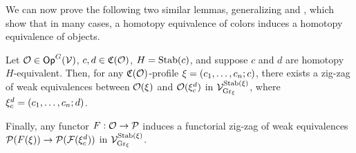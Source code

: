 \documentclass[a4paper,10pt
]{article}%
\renewcommand{\F}{\mathcal F}
\renewcommand{\1}{\ensuremath{\mathbb{id}}}
\begin{document}
We can now prove the following two similar lemmas, generalizing \cite[Prop. 4.14]{Cav14} and \cite[Prop. 2.12]{BM13},
which show that in many cases, a homotopy equivalence of colors induces a homotopy equivalence of objects.

\begin{lemma}
      \label{CAV_4.14_PROP1}
      Let $\mathcal{O} \in \mathsf{Op}^G(\mathcal V)$,
      $c,d \in \mathfrak C(\mathcal{O})$, 
      $H = \mathrm{Stab}(c)$, and suppose $c$ and $d$ are homotopy $H$-equivalent.
      Then, for any $\mathfrak C(\mathcal{O})$-profile $\xi = (c_1,\dots, c_n;c)$,
      there exists a zig-zag of weak equivalences between
      $\mathcal{O}(\xi)$ and $\mathcal{O}(\xi_c^d)$
      in $\mathcal V^{\mathrm{Stab}(\xi)}_{\mathrm{Gr}_\xi}$,
      where $\xi_c^d = (c_1,\dots, c_n;d)$.

      Finally, any functor $F: \mathcal{O} \to \mathcal{P}$ induces a functorial zig-zag of weak equivalences
      $\P(F(\ksi)) \to \P(\F(\ksi_c^d))$ in $\mathcal V^{\mathrm{Stab}(\xi)}_{\mathrm{Gr}_\xi}$. 
\end{lemma}
\end{document}
